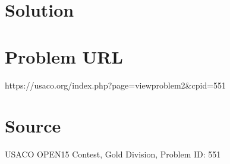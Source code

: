 \documentclass[12pt]{article}
\begin{document}
\section*{Solution}


\section*{Problem URL}
https://usaco.org/index.php?page=viewproblem2&cpid=551

\section*{Source}
USACO OPEN15 Contest, Gold Division, Problem ID: 551
\end{document}
